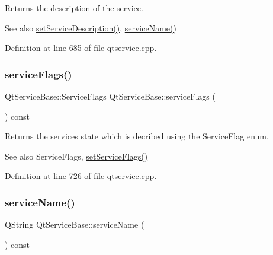 Returns the description of the service.

\begin{DoxySeeAlso}{See also}
\mbox{\hyperlink{class_qt_service_base_a09d7547436c65a900f18c58b2a650286}{set\+Service\+Description()}}, \mbox{\hyperlink{class_qt_service_base_a643f253b3931e6a6c4e8caa190756214}{service\+Name()}} 
\end{DoxySeeAlso}


Definition at line 685 of file qtservice.\+cpp.

\mbox{\label{class_qt_service_base_aab0b204981c481e098fe72061e3f367a}} 
\subsubsection{\texorpdfstring{service\+Flags()}{serviceFlags()}}
{\footnotesize\ttfamily Qt\+Service\+Base\+::\+Service\+Flags Qt\+Service\+Base\+::service\+Flags (\begin{DoxyParamCaption}{ }\end{DoxyParamCaption}) const}

Returns the service\textquotesingle{}s state which is decribed using the Service\+Flag enum.

\begin{DoxySeeAlso}{See also}
Service\+Flags, \mbox{\hyperlink{class_qt_service_base_a3f8a07d0cf536720e7fcf1ec562635d1}{set\+Service\+Flags()}} 
\end{DoxySeeAlso}


Definition at line 726 of file qtservice.\+cpp.

\mbox{\label{class_qt_service_base_a643f253b3931e6a6c4e8caa190756214}} 
\subsubsection{\texorpdfstring{service\+Name()}{serviceName()}}
{\footnotesize\ttfamily Q\+String Qt\+Service\+Base\+::service\+Name (\begin{DoxyParamCaption}{ }\end{DoxyParamCaption}) const}

